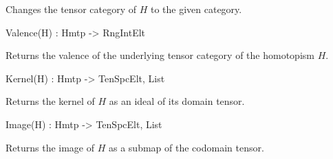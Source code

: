 Changes the tensor category of $H$ to the given category.

\begin{intrinsics}
Valence(H) : Hmtp -> RngIntElt
\end{intrinsics}

Returns the valence of the underlying tensor category of the homotopism $H$. 

\begin{intrinsics}
Kernel(H) : Hmtp -> TenSpcElt, List
\end{intrinsics}

Returns the kernel of $H$ as an ideal of its domain tensor.

\begin{intrinsics}
Image(H) : Hmtp -> TenSpcElt, List
\end{intrinsics}

Returns the image of $H$ as a submap of the codomain tensor.

